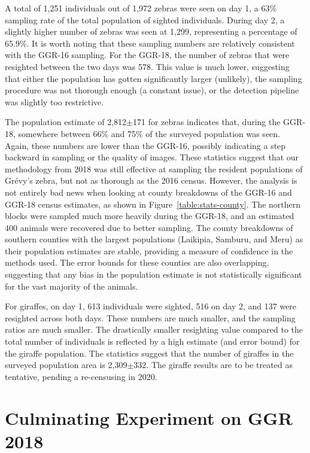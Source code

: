 A total of 1,251 individuals out of 1,972 zebras were seen on day 1, a 63\% sampling rate of the total population of sighted individuals.  During day 2, a slightly higher number of zebras was seen at 1,299, representing a percentage of 65.9\%.  It is worth noting that these sampling numbers are relatively consistent with the GGR-16 sampling.  For the GGR-18, the number of zebras that were resighted between the two days was 578.  This value is much lower, suggesting that either the population has gotten significantly larger (unlikely), the sampling procedure was not thorough enough (a constant issue), or the detection pipeline was slightly too restrictive.

The population estimate of 2,812$\pm$171 for zebras indicates that, during the GGR-18, somewhere between 66\% and 75\% of the surveyed population was seen.  Again, these numbers are lower than the GGR-16, possibly indicating a step backward in sampling or the quality of images.  These statistics suggest that our methodology from 2018 was still effective at sampling the resident populations of Gr\'evy's zebra, but not as thorough as the 2016 census. However, the analysis is not entirely bad news when looking at county breakdowns of the GGR-16 and GGR-18 census estimates, as shown in Figure~\ref{table:stats-county}.  The northern blocks were sampled much more heavily during the GGR-18, and an estimated 400 animals were recovered due to better sampling.  The county breakdowns of southern counties with the largest populations (Laikipia, Samburu, and Meru) as their population estimates are stable, providing a measure of confidence in the methods used.  The error bounds for these counties are also overlapping, suggesting that any bias in the population estimate is not statistically significant for the vast majority of the animals.

For giraffes, on day 1, 613 individuals were sighted, 516 on day 2, and 137 were resighted across both days.  These numbers are much smaller, and the sampling ratios are much smaller.  The drastically smaller resighting value compared to the total number of individuals is reflected by a high estimate (and error bound) for the giraffe population.  The statistics suggest that the number of giraffes in the surveyed population area is 2,309$\pm$332.  The giraffe results are to be treated as tentative, pending a re-censusing in 2020.

\section{Culminating Experiment on GGR 2018} \label{sec:ggr18-culminating}

